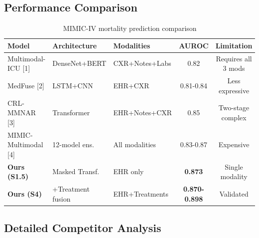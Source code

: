 \documentclass[11pt,a4paper]{article}
\renewcommand{\arraystretch}{1.25}
\begin{document}
\subsection{Performance Comparison}

\begin{table}[H]
\centering
\footnotesize
\renewcommand{\arraystretch}{1.3}
\begin{tabular}{p{2.8cm}p{2.2cm}p{2.5cm}cc}
\toprule
\rowcolor{tableheader}
\textbf{Model} & \textbf{Architecture} & \textbf{Modalities} & \textbf{AUROC} & \textbf{Limitation} \\
\midrule
Multimodal-ICU [1] & DenseNet+BERT & CXR+Notes+Labs & 0.82 & Requires all 3 mods \\
\rowcolor{lightbg}
MedFuse [2] & LSTM+CNN & EHR+CXR & 0.81-0.84 & Less expressive \\
CRL-MMNAR [3] & Transformer & EHR+Notes+CXR & 0.85 & Two-stage complex \\
\rowcolor{lightbg}
MIMIC-Multimodal [4] & 12-model ens. & All modalities & 0.83-0.87 & Expensive \\
\rowcolor{leading}
\textbf{Ours (S1.5)} & Masked Transf. & EHR only & \textbf{0.873} & Single modality \\
\rowcolor{leading}
\textbf{Ours (S4)} & +Treatment fusion & EHR+Treatments & \textbf{0.870-0.898} & Validated \\
\bottomrule
\end{tabular}
\caption{MIMIC-IV mortality prediction comparison}
\end{table}

\subsection{Detailed Competitor Analysis}
\end{document}
